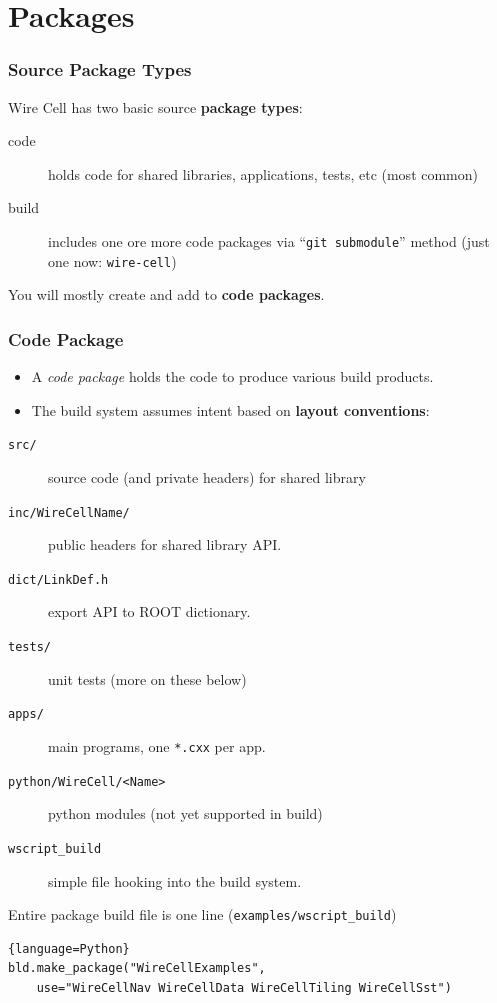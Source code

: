 \documentclass[xcolor=dvipsnames]{beamer}
\begin{document}
\section{Packages}

\begin{frame}[fragile]
\end{frame}

\begin{frame}
  \frametitle{Source Package Types}

  Wire Cell has two basic source \textbf{package types}:
  \begin{description}
  \item[code] holds code for shared libraries, applications, tests,
    etc (most common)
  \item[build] includes one ore more code packages via ``\texttt{git
      submodule}'' method (just one now: \texttt{wire-cell})
  \end{description}

  You will mostly create and add to \textbf{code packages}.
\end{frame}

\begin{frame}[fragile]
  \frametitle{Code Package}
  \footnotesize
  \begin{itemize}
  \item A \textit{code package} holds the code to produce various build products.
  \item The build system assumes intent based on \textbf{layout conventions}:
  \end{itemize}
  \begin{description}
  \item[\texttt{src/}] source code (and private headers) for shared library
  \item[\texttt{inc/WireCellName/}]  public headers for shared library
    API.
  \item[\texttt{dict/LinkDef.h}] export API to ROOT dictionary.
  \item[\texttt{tests/}] unit tests (more on these below)
  \item[\texttt{apps/}] main programs, one \texttt{*.cxx} per app.
  \item[\texttt{python/WireCell/<Name>}] python modules (not yet
    supported in build)
  \item[\texttt{wscript\_build}] simple file hooking into the build system.
  \end{description}

  \vspace{1mm}

  Entire package build file is one line (\texttt{examples/wscript\_build})
  \begin{lstlisting}{language=Python}
bld.make_package("WireCellExamples", 
    use="WireCellNav WireCellData WireCellTiling WireCellSst")
  \end{lstlisting}
\end{frame}
\end{document}
